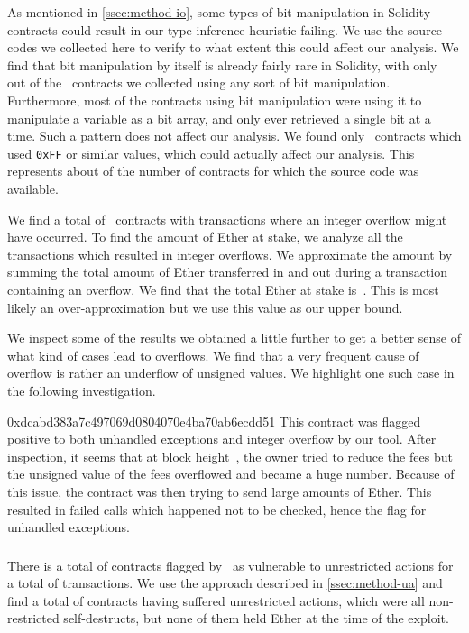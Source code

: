 As mentioned in \autoref{ssec:method-io}, some types of bit manipulation in Solidity contracts could result in our type inference heuristic failing. We use the source codes we collected here to verify to what extent this could affect our analysis. We find that bit manipulation by itself is already fairly rare in Solidity, with only~ out of the~ contracts we collected using any sort of bit manipulation. Furthermore, most of the contracts using bit manipulation were using it to manipulate a variable as a bit array, and only ever retrieved a single bit at a time. Such a pattern does not affect our analysis. We found only~ contracts which used \lstinline{0xFF} or similar values, which could actually affect our analysis. This represents about  of the number of contracts for which the source code was available.

We find a total of~ contracts with transactions where an integer overflow might have occurred.
To find the amount of Ether at stake, we analyze all the transactions which resulted in integer overflows. We approximate the amount by summing the total amount of Ether transferred in and out during a transaction containing an overflow. We find that the total Ether at stake is~. This is most likely an over-approximation but we use this value as our upper bound.

We inspect some of the results we obtained a little further to get a better sense of what kind of cases lead to overflows.
We find that a very frequent cause of overflow is rather an underflow of unsigned values.
We highlight one such case in the following investigation.

\begin{investigation}{0xdcabd383a7c497069d0804070e4ba70ab6ecdd51}
This contract was flagged positive to both unhandled exceptions and integer overflow by our tool.
%
After inspection, it seems that at block height~, the owner tried to reduce the fees but the unsigned value of the fees overflowed and became a huge number. Because of this issue, the contract was then trying to send large amounts of Ether. 
%
This resulted in failed calls which happened not to be checked, hence the flag for unhandled exceptions.
\end{investigation}

\subsubsection{\unrestrictedaction}
\label{ssec:analysis-ua}
There is a total of  contracts flagged by~\cite{Tsankov2018,Nikolic2018a,Krupp2018} as vulnerable to unrestricted actions for a total of  transactions. We use the approach described in \autoref{ssec:method-ua} and find a total of  contracts having suffered unrestricted actions, which were all non-restricted self-destructs, but none of them held Ether at the time of the exploit.

